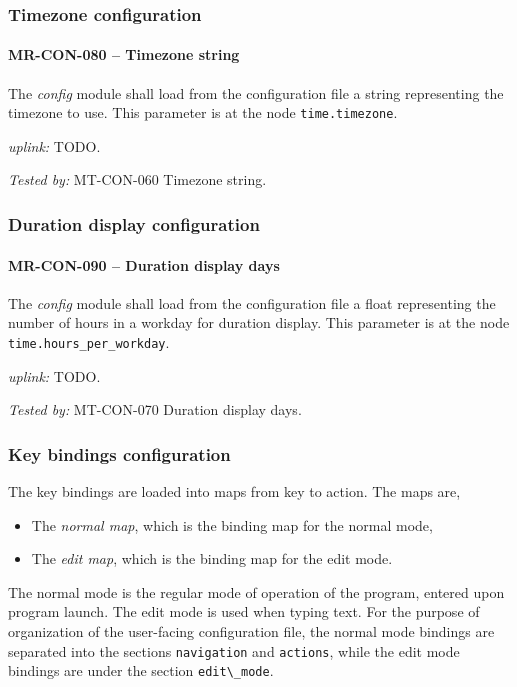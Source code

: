 \subsubsection{Timezone configuration}
\paragraph{MR-CON-080 -- Timezone string}
The \emph{config} module shall load from the configuration file a string
representing the timezone to use. This parameter is at the node
\lstinline{time.timezone}.

\textit{uplink: } TODO.

\textit{Tested by: } MT-CON-060 Timezone string.

\subsubsection{Duration display configuration}
\paragraph{MR-CON-090 -- Duration display days}
The \emph{config} module shall load from the configuration file a float
representing the number of hours in a workday for duration display.
This parameter is at the node \lstinline{time.hours_per_workday}.

\textit{uplink: } TODO.

\textit{Tested by: } MT-CON-070 Duration display days.

\subsubsection{Key bindings configuration}
The key bindings are loaded into maps from key to action. The maps are,
\begin{itemize}
\item The \emph{normal map}, which is the binding map for the normal mode,
\item The \emph{edit map}, which is the binding map for the edit mode.
\end{itemize}

The normal mode is the regular mode of operation of the program, entered
upon program launch. The edit mode is used when typing text.
For the purpose of organization of the user-facing configuration file,
the normal mode bindings are separated into the sections \lstinline{navigation}
and \lstinline{actions}, while the edit mode bindings are under the section
\lstinline{edit\_mode}.

